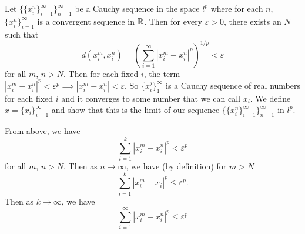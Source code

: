 
\begin{solution}
    Let $\{\{x_i^n\}_{i=1}^\infty\}_{n=1}^\infty$
    be a Cauchy sequence in
    the space $l^p$ where for each $n$,
    $\{x_i^n\}_{i=1}^\infty$ is a convergent
    sequence in $\mathbb{R}$. Then for every $\varepsilon>0$,
    there exists an $N$ such that
    $$d(x_i^m,x_i^n)
    =\left(\sum_{i=1}^\infty{
        |x_i^m-x_i^n|^p
    }\right)^{1/p}<\varepsilon$$
    for all $m$, $n>N$. Then for each fixed $i$,
    the term
    $|x_i^m-x_i^n|^p<\varepsilon^p\implies
    |x_i^m-x_i^n|<\varepsilon$. So 
    $\{x_i^j\}_1^\infty$ is a Cauchy
    sequence of real
    numbers for each fixed $i$ and it converges
    to some number that we can call $x_i$.
    We define $x=\{x_i\}_{i=1}^\infty$ and show that
    this is the limit of our sequence
    $\{\{x_i^n\}_{i=1}^\infty\}_{n=1}^\infty$ in
    $l^p$.

    From above, we have
    $$\sum_{i=1}^k{
        |x_i^m-x_i^n|^p
    }<\varepsilon^p$$ for all $m$, $n>N$. Then as 
    $n\to \infty$, we have (by definition) for $m>N$
    $$\sum_{i=1}^k{
        |x_i^m-x_i|^p
    }\leq\varepsilon^p.$$
    Then as $k\to \infty$, we have
    $$\sum_{i=1}^\infty{
        |x_i^m-x_i^n|^p
    }\leq\varepsilon^p$$
\end{solution}